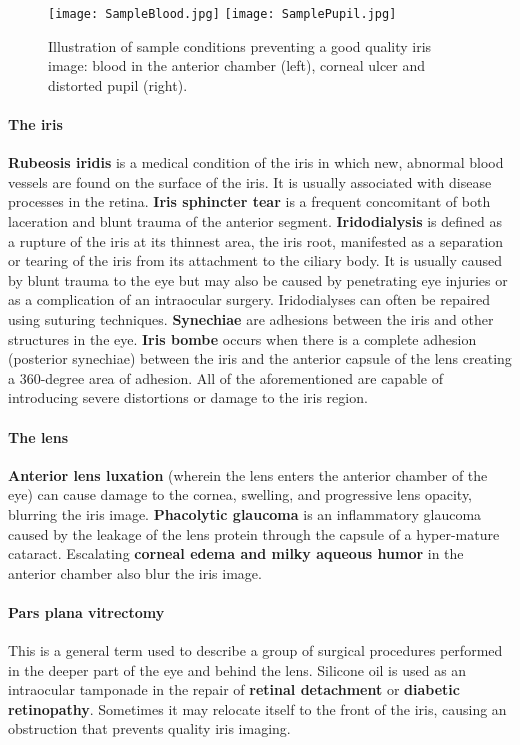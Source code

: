 \documentclass[article,12pt]{elsarticle}
\begin{document}
\begin{figure}[!htb]
\centering
\texttt{[image: SampleBlood.jpg]}\hfill
\texttt{[image: SamplePupil.jpg]}
\caption{Illustration of sample conditions preventing a good quality iris image: blood in the anterior chamber (left), corneal ulcer and distorted pupil (right).}
\label{fig:fkps}
\end{figure}

\paragraph{\textbf{The iris}} \textbf{Rubeosis iridis} is a medical condition of the iris in which new, abnormal blood vessels are found on the surface of the iris. It is usually associated with disease processes in the retina. \textbf{Iris sphincter tear} is a frequent concomitant of both laceration and blunt trauma of the anterior segment. \textbf{Iridodialysis} is defined as a rupture of the iris at its thinnest area, the iris root, manifested as a separation or tearing of the iris from its attachment to the ciliary body. It is usually caused by blunt trauma to the eye but may also be caused by penetrating eye injuries or as a complication of an intraocular surgery. Iridodialyses can often be repaired using suturing techniques. \textbf{Synechiae} are adhesions between the iris and other structures in the eye. \textbf{Iris bombe} occurs when there is a complete adhesion (posterior synechiae) between the iris and the anterior capsule of the lens creating a 360-degree area of adhesion. All of the aforementioned are capable of introducing severe distortions or damage to the iris region.

\paragraph{\textbf{The lens}} \textbf{Anterior lens luxation} (wherein the lens enters the anterior chamber of the eye) can cause damage to the cornea, swelling, and progressive lens opacity, blurring the iris image. \textbf{Phacolytic glaucoma} is an inflammatory glaucoma caused by the leakage of the lens protein through the capsule of a hyper-mature cataract. Escalating \textbf{corneal edema and milky aqueous humor} in the anterior chamber also blur the iris image.

\paragraph{\textbf{Pars plana vitrectomy}} This is a general term used to describe a group of surgical procedures performed in the deeper part of the eye and behind the lens. Silicone oil is used as an intraocular tamponade in the repair of \textbf{retinal detachment} or \textbf{diabetic retinopathy}. Sometimes it may relocate itself to the front of the iris, causing an obstruction that prevents quality iris imaging.
\end{document}
